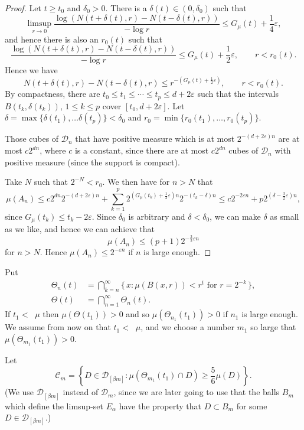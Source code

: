 \documentclass[AHL,Unicode,longabstracts]{cedram}
\DeclareMathOperator{\udimh}{\overline{dim}_H}
\begin{document}
\begin{proof}
Let $t \geq t_0$ and $\delta_0 > 0$. There is a $\delta (t) \in (0,
\delta_0)$ such that
\[
\limsup_{r \to 0} \frac{\log (N(t + \delta (t), r) - N(t - \delta (t), r))}{- \log r} \leq G_\mu (t) + \frac{1}{4} \varepsilon,
\]
and hence there is also an $r_0 (t)$ such that
\[
\frac{\log (N(t + \delta (t), r) - N(t - \delta (t), r))}{- \log r}
\leq G_\mu (t) + \frac{1}{2} \varepsilon, \qquad r < r_0 (t).
\]
Hence we have
\[
N(t + \delta (t), r) - N(t - \delta (t), r) \leq r^{-(G_\mu (t) +
\frac{1}{2} \varepsilon)}, \qquad r < r_0 (t).
\]
By compactness, there are $t_0 \leq t_1 \leq \cdots \leq t_p \leq d + 2 \varepsilon$ such that the intervals $B(t_k, \delta (t_k))$, $1
\leq k \leq p$ cover $[t_0, d + 2 \varepsilon]$. Let $\delta = \max
\{\delta (t_1), \ldots \delta (t_p) \} < \delta_0$ and $r_0 = \min
\{ r_0 (t_1), \ldots, r_0 (t_p) \}$.

Those cubes of $\mathscr{D}_n$ that have positive measure which is at most $2^{-(d + 2 \varepsilon) n}$ are at most $c 2^{dn}$, where $c$ is a constant, since there are at most $c 2^{dn}$ cubes of $\mathscr{D}_n$ with positive measure (since the support is compact).

Take $N$ such that $2^{-N} < r_0$. We then have for $n > N$ that
\[
\mu (A_n) \leq c 2^{dn} 2^{-(d + 2 \varepsilon) n} + \sum_{k = 1}^p 2^{(G_\mu (t_k) + \frac{1}{2} \varepsilon) n} 2^{-(t_k - \delta) n}
\leq c 2^{- 2 \varepsilon n} + p 2^{(\delta - \frac{3}{2}
\varepsilon)n},
\]
since $G_\mu (t_k) \leq t_k - 2 \varepsilon$. Since $\delta_0$ is arbitrary and $\delta < \delta_0$, we can make $\delta$ as small as we like, and hence we can achieve that
\[
\mu (A_n) \leq (p+1) 2^{- \frac{3}{2} \varepsilon n}
\]
for $n > N$. Hence $\mu (A_n) \leq 2^{- \varepsilon n}$ if $n$ is large enough.
\end{proof}

Put
\begin{align*}
\Theta_n (t) &= \bigcap_{k=n}^\infty \{\, x : \mu (B(x,r)) < r^t
\text{ for } r = 2^{- k} \,\}, \\ \Theta (t) &= \bigcap_{n=1}^\infty
\Theta_n (t).
\end{align*}
If $t_1 < \udimh \mu$ then $\mu (\Theta (t_1)) > 0$ and so $\mu (\Theta_{n_1} (t_1)) > 0$ if $n_1$ is large enough. We assume from now on that $t_1 < \udimh \mu$, and we choose a number $m_1$ so large that $\mu (\Theta_{m_1} (t_1)) > 0$.

Let
\[
\mathscr{C}_m = \left\{ D \in \mathscr{D}_{[\beta m]} : \mu (\Theta_{m_1} (t_1) \cap D) \geq \frac{5}{6} \mu (D) \right\}.
\]
(We use $\mathscr{D}_{[\beta m]}$ instead of $\mathscr{D}_m$, since we are later going to use that the balls $B_m$ which define the limsup-set $E_\alpha$ have the property that $D \subset B_m$ for some $D \in \mathscr{D}_{[\beta m]}$.)
\end{document}
